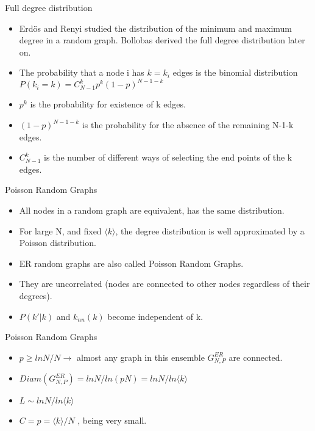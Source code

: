 \documentclass{beamer}
\begin{document}

\begin{frame}{Full degree distribution}

\begin{itemize}
 \item Erdös and Renyi studied the distribution of the minimum and maximum degree in a random graph. Bollobas derived the full degree distribution later on.
 \item The probability that a node i has $k=k_i$ edges is the binomial distribution $P(k_i=k)=C_{N-1}^k p^k (1-p)^{N-1-k}$ 
 \item $p^k$ is the probability for existence of k edges.
 \item $(1-p)^{N-1-k}$ is the probability for the absence of the remaining N-1-k edges.
 \item $C_{N-1}^k$ is the number of different ways of selecting the end points of the k edges.
\end{itemize}

\end{frame}

\begin{frame}{Poisson Random Graphs}

\begin{itemize}
 \item All nodes in a random graph are equivalent, has the same distribution.
 \item For large N, and fixed $\langle k \rangle$, the degree distribution is well approximated by a Poisson distribution.
 \item ER random graphs are also called Poisson Random Graphs.
 \item They are uncorrelated (nodes are connected to other nodes regardless of their degrees).
 \item $P(k'|k)$ and $k_{nn}(k)$ become independent of k.
\end{itemize}

\end{frame}


\begin{frame}{Poisson Random Graphs}

\begin{itemize}
 \item $p \geq lnN/N \rightarrow $ almost any graph in this ensemble $G^{ER}_{N,P}$ are connected.
 \item $Diam(G^{ER}_{N,P}) = lnN/ln(pN) = lnN/ln\langle k \rangle$
 \item $L \sim lnN/ln\langle k \rangle$
 \item $C= p = \langle k \rangle/N$ , being very small.
\end{itemize}

\end{frame}
\end{document}
